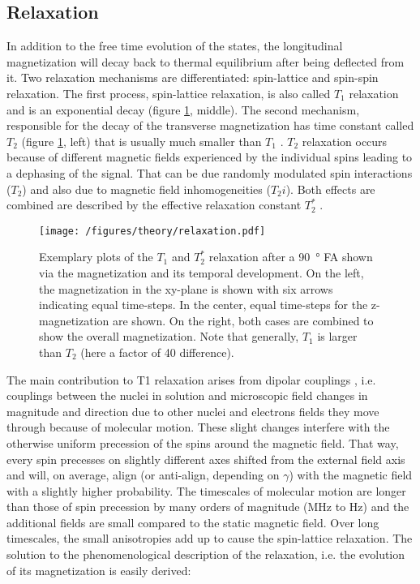         \subsection{Relaxation}
        \label{chapter:theory:relaxation}
        In addition to the free time evolution of the states, the longitudinal magnetization will decay back to thermal equilibrium after being deflected from it. Two relaxation mechanisms are differentiated: spin-lattice and spin-spin relaxation. The first process, spin-lattice relaxation, is also called $T_1$ relaxation and is an exponential decay (figure \ref{theory:figure:relaxation}, middle). The second mechanism, responsible for the decay of the transverse magnetization has time constant called $T_2$ (figure \ref{theory:figure:relaxation}, left) that is usually much smaller than $T_1$ \cite{levitt_spin_nodate}. $T_2$ relaxation occurs because of different magnetic fields experienced by the individual spins leading to a dephasing of the signal. That can be due randomly modulated spin interactions ($T_2$) and also due to magnetic field inhomogeneities ($T_2i$). Both effects are combined are described by the effective relaxation constant $T_2^*$ \cite{chavhan_principles_2009}.
            \begin{figure}
                \centering
                \texttt{[image: /figures/theory/relaxation.pdf]}
                \caption[Relaxation in NMR]{Exemplary plots of the $T_1$ and $T_2^*$ relaxation after a \SI{90}{\degree} FA shown via the magnetization and its temporal development. On the left, the magnetization in the xy-plane is shown with six arrows indicating equal time-steps. In the center, equal time-steps for the z-magnetization are shown. On the right, both cases are combined to show the overall magnetization. Note that generally, $T_1$ is larger than $T_2$ (here a factor of 40 difference).}
                \label{theory:figure:relaxation}
            \end{figure}
         The main contribution to T1 relaxation arises from dipolar couplings \cite{levitt_spin_nodate}, i.e. couplings between the nuclei in solution and microscopic field changes in magnitude and direction due to other nuclei and electrons fields they move through because of molecular motion. These slight changes interfere with the otherwise uniform precession of the spins around the magnetic field. That way, every spin precesses on slightly different axes shifted from the external field axis and will, on average, align (or anti-align, depending on $\gamma$) with the magnetic field with a slightly higher probability. The timescales of molecular motion are longer than those of spin precession by many orders of magnitude (\si{\mega\hertz} to \si{\hertz}) and the additional fields are small compared to the static magnetic field. Over long timescales, the small anisotropies add up to cause the spin-lattice relaxation. The solution to the phenomenological description of the relaxation, i.e. the  evolution of its magnetization is easily derived:
